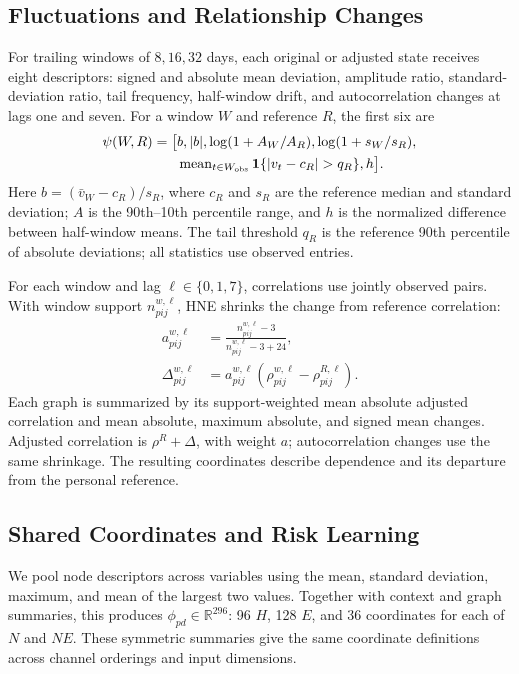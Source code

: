 \subsection{Fluctuations and Relationship Changes}
\label{sec:descriptors}

For trailing windows of $8,16,32$ days, each original or adjusted state receives eight descriptors: signed and absolute mean deviation, amplitude ratio, standard-deviation ratio, tail frequency, half-window drift, and autocorrelation changes at lags one and seven. For a window $W$ and reference $R$, the first six are
\begin{equation}
\begin{split}
\psi(W,R)=\big[&b,|b|,\log(1+A_W/A_R),\log(1+s_W/s_R),\\
&\operatorname{mean}_{t\in W_{\rm obs}}\mathbf1\{|v_t-c_R|>q_R\},h\big].
\end{split}
\end{equation}
Here $b=(\bar v_W-c_R)/s_R$, where $c_R$ and $s_R$ are the reference median and standard deviation; $A$ is the 90th--10th percentile range, and $h$ is the normalized difference between half-window means. The tail threshold $q_R$ is the reference 90th percentile of absolute deviations; all statistics use observed entries.

For each window and lag $\ell\in\{0,1,7\}$, correlations use jointly observed pairs. With window support $n_{pij}^{w,\ell}$, HNE shrinks the change from reference correlation:
\begin{equation}
\begin{aligned}
a_{pij}^{w,\ell}&=\frac{n_{pij}^{w,\ell}-3}{n_{pij}^{w,\ell}-3+24},\\
\Delta_{pij}^{w,\ell}&=a_{pij}^{w,\ell}(\rho_{pij}^{w,\ell}-\rho_{pij}^{R,\ell}).
\end{aligned}
\end{equation}
Each graph is summarized by its support-weighted mean absolute adjusted correlation and mean absolute, maximum absolute, and signed mean changes. Adjusted correlation is $\rho^R+\Delta$, with weight $a$; autocorrelation changes use the same shrinkage. The resulting coordinates describe dependence and its departure from the personal reference.

\subsection{Shared Coordinates and Risk Learning}
\label{sec:risk}

We pool node descriptors across variables using the mean, standard deviation, maximum, and mean of the largest two values. Together with context and graph summaries, this produces $\phi_{pd}\in\mathbb R^{296}$: 96 $H$, 128 $E$, and 36 coordinates for each of $N$ and $NE$. These symmetric summaries give the same coordinate definitions across channel orderings and input dimensions.

